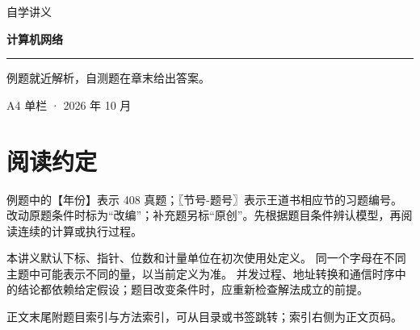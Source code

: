 
\newcommand{\BookTitle}{计算机网络}

\begin{titlepage}
\thispagestyle{empty}
\vspace*{25mm}
{\sffamily\color{accent}\fontsize{16}{24} 自学讲义}\par
\vspace{15mm}
{\sffamily\bfseries\color{ink}\fontsize{32}{45}\selectfont 计算机网络}\par
\vspace{15mm}
\noindent\rule{\textwidth}{0.5pt}\par
\vspace{5mm}
\noindent 例题就近解析，自测题在章末给出答案。\par
\vfill
\noindent A4 单栏 · 2026 年 10 月\par
\end{titlepage}
\tableofcontents
\clearpage
{}\chapter*{阅读约定}
例题中的【年份】表示 408 真题；〖节号-题号〗表示王道书相应节的习题编号。
改动原题条件时标为“改编”；补充题另标“原创”。先根据题目条件辨认模型，再阅读连续的计算或执行过程。

本讲义默认下标、指针、位数和计量单位在初次使用处定义。
同一个字母在不同主题中可能表示不同的量，以当前定义为准。
并发过程、地址转换和通信时序中的结论都依赖给定假设；题目改变条件时，应重新检查解法成立的前提。

正文末尾附题目索引与方法索引，可从目录或书签跳转；索引右侧为正文页码。
\clearpage
{}
\setcounter{chapter}{0}



